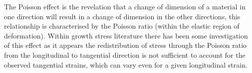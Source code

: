 The Poisson effect is the revelation that a change of dimension of a material
in one direction will result in a change of dimension in the other directions,
this relationship is characterised by the Poisson ratio (within the elastic
region of deformation). Within growth stress literature there has been some
investigation of this effect as it appears the redistribution of stress through
the Poisson ratio from the longitudinal to tangential direction is not
sufficient to account for the observed tangential strains, which can vary even
for a given longitudinal strain.